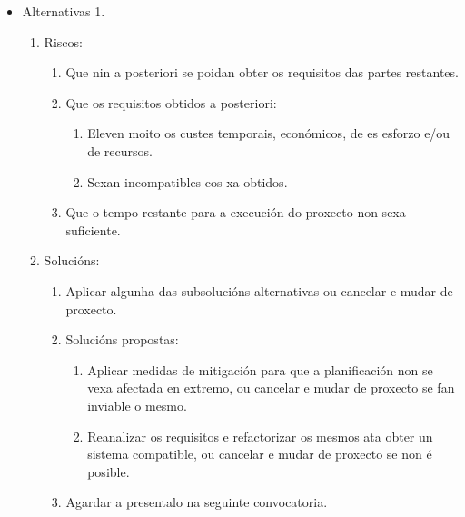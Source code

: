  \begin{itemize}
  \item Alternativas 1.
        \begin{enumerate}
         \item Riscos:
               \begin{enumerate}
                \item Que nin a posteriori se poidan obter os requisitos das
                      partes restantes.
                \item Que os requisitos obtidos a posteriori:
                      \begin{enumerate}
                       \item Eleven moito os custes temporais, económicos, de
                             es esforzo e/ou de recursos.
                       \item Sexan incompatibles cos xa obtidos.
                      \end{enumerate}
                \item Que o tempo restante para a execución do proxecto non
                      sexa suficiente.
               \end{enumerate}
         \item Solucións:
               \begin{enumerate}
                \item Aplicar algunha das subsolucións alternativas ou cancelar
                      e mudar de proxecto.
                \item Solucións propostas:
                      \begin{enumerate}
                       \item Aplicar medidas de mitigación para que a
                             planificación non se vexa afectada en extremo, ou
                             cancelar e mudar de proxecto se fan inviable o
                             mesmo.
                       \item Reanalizar os requisitos e refactorizar os mesmos
                             ata obter un sistema compatible, ou cancelar e
                             mudar de proxecto se non é posible.
                      \end{enumerate}
                \item Agardar a presentalo na seguinte convocatoria.
               \end{enumerate}
        \end{enumerate}
 \end{itemize}

